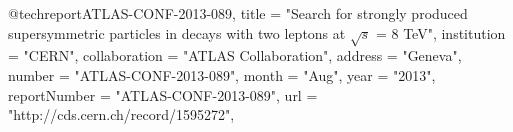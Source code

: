@techreport{ATLAS-CONF-2013-089,
      title         = "{Search for strongly produced supersymmetric particles in
                       decays with two leptons at $\sqrt{s}$ = 8 TeV}",
      institution   = "CERN",
      collaboration = "ATLAS Collaboration",
      address       = "Geneva",
      number        = "ATLAS-CONF-2013-089",
      month         = "Aug",
      year          = "2013",
      reportNumber  = "ATLAS-CONF-2013-089",
      url           = "http://cds.cern.ch/record/1595272",
}


